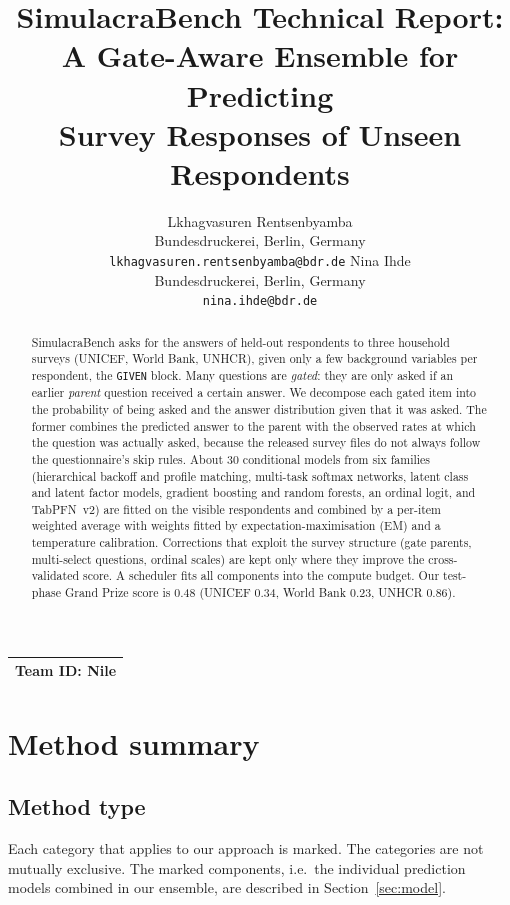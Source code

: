 \documentclass{article}
\title{SimulacraBench Technical Report:\\ A Gate-Aware Ensemble for Predicting\\ Survey Responses of Unseen Respondents}
\author{%
  Lkhagvasuren Rentsenbyamba\\
  Bundesdruckerei, Berlin, Germany\\
  \texttt{lkhagvasuren.rentsenbyamba@bdr.de}
  \And
  Nina Ihde\\
  Bundesdruckerei, Berlin, Germany\\
  \texttt{nina.ihde@bdr.de}
}
\newcommand{\teamid}{Nile}
\begin{document}
\maketitle

\begin{center}
\begin{tabular}{l}
\toprule
\textbf{Team ID:} \teamid \\
\bottomrule
\end{tabular}
\end{center}

\begin{abstract}
SimulacraBench asks for the answers of held-out respondents to three household surveys (UNICEF,
World Bank, UNHCR), given only a few background variables per respondent, the \texttt{GIVEN}
block. Many questions are \emph{gated}: they are only asked if an earlier \emph{parent} question
received a certain answer. We decompose each gated item into the probability of being asked and the
answer distribution given that it was asked. The former combines the predicted answer to the parent
with the observed rates at which the question was actually asked, because the
released survey files do not always follow the questionnaire's skip rules. About 30 conditional models from six families (hierarchical backoff and
profile matching, multi-task softmax networks, latent class and latent factor models, gradient
boosting and random forests, an ordinal logit, and TabPFN~v2) are fitted on the visible respondents
and combined by a per-item weighted average with weights fitted by expectation-maximisation (EM) and a
temperature calibration. Corrections that exploit the survey structure (gate parents, multi-select
questions, ordinal scales) are kept only where they improve the cross-validated score. A scheduler fits all components into the compute
budget. Our test-phase Grand Prize score is 0.48 (UNICEF 0.34, World Bank 0.23, UNHCR 0.86).
\end{abstract}

\section{Method summary}
\label{sec:method}

\subsection{Method type}
Each category that applies to our approach is marked. The categories are not mutually exclusive. The marked components, i.e.\ the individual prediction models combined in our ensemble, are
described in Section~\ref{sec:model}.
\end{document}
